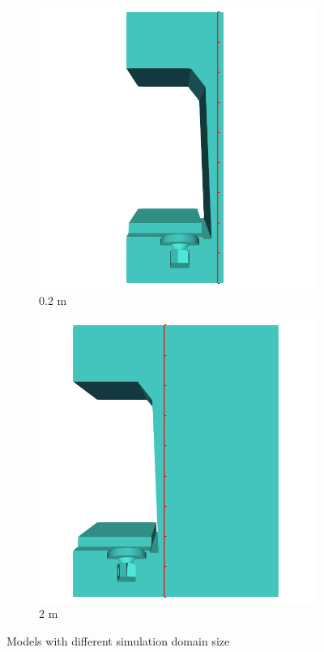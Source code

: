 \begin{figure}[H]
	\centering
	\begin{subfigure}[b]{0.45\textwidth}
		\centering
		\includegraphics[width=\linewidth]{fig/chap4/simulation_domain/0pt2m.png}
		\caption{0.2 m}
	\end{subfigure}
	\hfill
	\begin{subfigure}[b]{0.45\textwidth}
		\centering
		\includegraphics[width=\linewidth]{fig/chap4/simulation_domain/2m.png}
		\caption{2 m}
	\end{subfigure}
	\caption{Models with different simulation domain size}
	\label{fig:domain_size_variation}
\end{figure}

